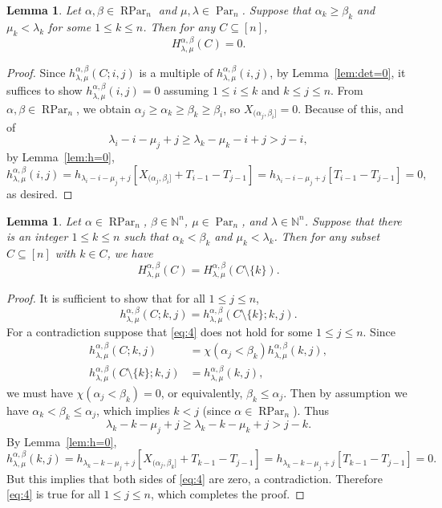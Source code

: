 \documentclass[12pt]{amsart}
\numberwithin{equation}{section}
\newtheorem{lem}[thm]{Lemma}
\theoremstyle{definition}
\newcommand\NN{\mathbb{N}}
\newcommand\Par{\operatorname{Par}}
\newcommand\RPar{\operatorname{RPar}}
\begin{document}
\begin{lem}\label{lem:HC=0 mu<la}
  Let $\alpha,\beta\in\RPar_n$ and $\mu,\lambda\in\Par_n$. Suppose that
  $\alpha_k\ge \beta_k$ and $\mu_k<\lambda_k$ for some $1\le k\le n$. Then for
  any $C\subseteq [n]$,
\[
H^{\alpha,\beta}_{\lambda,\mu}(C)  = 0.
\]
\end{lem}
\begin{proof}
  Since $h^{\alpha,\beta}_{\lambda,\mu}(C;i,j)$ is a multiple of
  $h^{\alpha,\beta}_{\lambda,\mu}(i,j)$, by Lemma~\ref{lem:det=0}, it suffices
  to show $h^{\alpha,\beta}_{\lambda,\mu}(i,j)=0$ assuming $1\le i\le k$ and
  $k\le j\le n$. From $\alpha, \beta \in \RPar_n$, we obtain
  $\alpha_j\ge \alpha_k\ge \beta_k\ge \beta_i$, so
  $X_{(\alpha_j,\beta_i]} = 0$. Because of this, and of
  \[
\lambda_i-i-\mu_j+j\ge \lambda_k-\mu_k-i+j>j-i,
  \]  
  by Lemma~\ref{lem:h=0},
  \[
h^{\alpha,\beta}_{\lambda,\mu}(i,j) = h_{\lambda_i-i-\mu_j+j}[X_{(\alpha_j,\beta_i]}+T_{i-1}-T_{j-1}] = 
h_{\lambda_i-i-\mu_j+j}[T_{i-1}-T_{j-1}]=0,
  \]
  as desired.
\end{proof}





\begin{lem}\label{lem:H(C)=H(C,k)}
  Let $\alpha\in\RPar_n$, $\beta\in\NN^n$, $\mu\in\Par_n$, and $\lambda\in\NN^n$. Suppose
  that there is an integer $1\le k\le n$ such that $\alpha_k<\beta_k$ and
  $\mu_k<\lambda_k$. Then for any subset $C\subseteq[n]$ with $k\in C$, we have
\[
H^{\alpha,\beta}_{\lambda,\mu}(C)  = H^{\alpha,\beta}_{\lambda,\mu}(C\setminus\{k\}).
\]
\end{lem}
\begin{proof}
  It is sufficient to show that for all $1\le j\le n$,
  \begin{equation}
    \label{eq:4}
h^{\alpha,\beta}_{\lambda,\mu}(C;k,j) = h^{\alpha,\beta}_{\lambda,\mu}(C\setminus \{k\};k,j).    
  \end{equation}
  For a contradiction suppose that \eqref{eq:4} does not hold for some
  $1\le j\le n$. Since
  \begin{align*}
    h^{\alpha,\beta}_{\lambda,\mu}(C;k,j) &=
    \chi(\alpha_j<\beta_k) h^{\alpha,\beta}_{\lambda,\mu}(k,j),\\
    h^{\alpha,\beta}_{\lambda,\mu}(C\setminus\{k\};k,j) &=
     h^{\alpha,\beta}_{\lambda,\mu}(k,j),
  \end{align*}
  we must have $\chi(\alpha_j<\beta_k)=0$, or equivalently, $\beta_k\le
  \alpha_j$. Then by assumption we have $\alpha_{k}<\beta_k\le \alpha_j$, which
  implies $k< j$ (since $\alpha \in \RPar_n$). Thus
  \[
    \lambda_k-k-\mu_j+j\ge \lambda_k-k-\mu_k+j > j-k.
  \]
  By Lemma~\ref{lem:h=0},
  \[
    h^{\alpha,\beta}_{\lambda,\mu}(k,j) =
    h_{\lambda_k-k-\mu_j+j}[X_{(\alpha_j,\beta_k]}+T_{k-1}-T_{j-1}] =
    h_{\lambda_k-k-\mu_j+j}[T_{k-1}-T_{j-1}]=0.
  \]
  But this implies that both sides of \eqref{eq:4} are zero, a contradiction.
  Therefore \eqref{eq:4} is true for all $1\le j\le n$, which completes the
  proof.
\end{proof}
\end{document}
